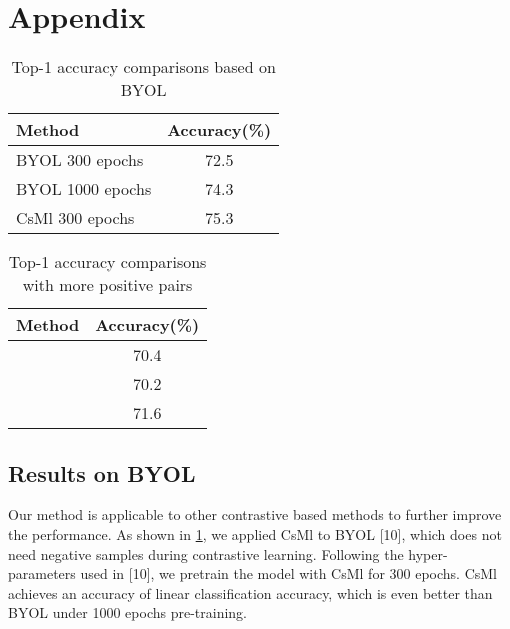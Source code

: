 \documentclass[10pt,twocolumn,letterpaper]{article}
\begin{document}
\clearpage
\appendix
\section{Appendix}

\renewcommand\thefigure{\thesection.\arabic{figure}}
\renewcommand\thetable{\thesection.\arabic{table}}
\setcounter{figure}{0} 
\setcounter{table}{0} 

\begin{table}[]
\centering
\caption{Top-1 accuracy comparisons based on BYOL}

\vspace{0.01in}
\begin{tabular}{lc}
\toprule
Method  & Accuracy(\%)  \\
\midrule
BYOL 300 epochs & 72.5        \\
BYOL 1000 epochs & 74.3        \\
CsMl 300 epochs & 75.3 \\

\bottomrule
\end{tabular}
\label{tab: HSA_byol}
\end{table}

\begin{table}[]
\centering
\caption{Top-1 accuracy comparisons with more positive pairs}

\vspace{0.01in}
\begin{tabular}{lc}
\toprule
Method  & Accuracy(\%)  \\
\midrule
 & 70.4        \\
 & 70.2  \\
 & 71.6 \\

\bottomrule
\end{tabular}
\label{tab: more_postive}
\end{table}


\subsection{{Results on BYOL}}
{Our method is applicable to other contrastive based methods to further improve the performance. As shown in \ref{tab: HSA_byol}, we applied CsMl to BYOL [10], which does not need negative samples during contrastive learning. Following the hyper-parameters used in [10], we pretrain the model with CsMl for 300 epochs. CsMl achieves an accuracy of  linear classification accuracy, which is even better than BYOL under 1000 epochs pre-training. }
\end{document}
